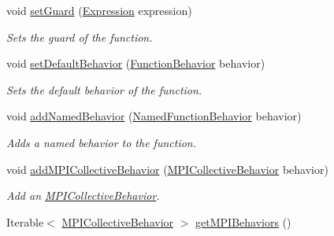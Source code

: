 \begin{DoxyCompactItemize}
void \hyperlink{interfaceedu_1_1udel_1_1cis_1_1vsl_1_1civl_1_1model_1_1IF_1_1contract_1_1FunctionContract_aba7439cdcbca9423cc4db20aeb89b7aa}{set\+Guard} (\hyperlink{interfaceedu_1_1udel_1_1cis_1_1vsl_1_1civl_1_1model_1_1IF_1_1expression_1_1Expression}{Expression} expression)
\begin{DoxyCompactList}\small\item\em Sets the guard of the function. \end{DoxyCompactList}\item 
void \hyperlink{interfaceedu_1_1udel_1_1cis_1_1vsl_1_1civl_1_1model_1_1IF_1_1contract_1_1FunctionContract_a8f02674a6cc2d167d35b3f7b433b9a46}{set\+Default\+Behavior} (\hyperlink{interfaceedu_1_1udel_1_1cis_1_1vsl_1_1civl_1_1model_1_1IF_1_1contract_1_1FunctionBehavior}{Function\+Behavior} behavior)
\begin{DoxyCompactList}\small\item\em Sets the default behavior of the function. \end{DoxyCompactList}\item 
void \hyperlink{interfaceedu_1_1udel_1_1cis_1_1vsl_1_1civl_1_1model_1_1IF_1_1contract_1_1FunctionContract_abfe6418e6c210ca83ca79eb4aacc0911}{add\+Named\+Behavior} (\hyperlink{interfaceedu_1_1udel_1_1cis_1_1vsl_1_1civl_1_1model_1_1IF_1_1contract_1_1NamedFunctionBehavior}{Named\+Function\+Behavior} behavior)
\begin{DoxyCompactList}\small\item\em Adds a named behavior to the function. \end{DoxyCompactList}\item 
void \hyperlink{interfaceedu_1_1udel_1_1cis_1_1vsl_1_1civl_1_1model_1_1IF_1_1contract_1_1FunctionContract_a362bf58449de35ab3ce54c86ff73660a}{add\+M\+P\+I\+Collective\+Behavior} (\hyperlink{interfaceedu_1_1udel_1_1cis_1_1vsl_1_1civl_1_1model_1_1IF_1_1contract_1_1MPICollectiveBehavior}{M\+P\+I\+Collective\+Behavior} behavior)
\begin{DoxyCompactList}\small\item\em Add an \hyperlink{interfaceedu_1_1udel_1_1cis_1_1vsl_1_1civl_1_1model_1_1IF_1_1contract_1_1MPICollectiveBehavior}{M\+P\+I\+Collective\+Behavior}. \end{DoxyCompactList}\item 
Iterable$<$ \hyperlink{interfaceedu_1_1udel_1_1cis_1_1vsl_1_1civl_1_1model_1_1IF_1_1contract_1_1MPICollectiveBehavior}{M\+P\+I\+Collective\+Behavior} $>$ \hyperlink{interfaceedu_1_1udel_1_1cis_1_1vsl_1_1civl_1_1model_1_1IF_1_1contract_1_1FunctionContract_ae74394b39e896050a93c002a3d02f38f}{get\+M\+P\+I\+Behaviors} ()

\end{DoxyCompactItemize}
